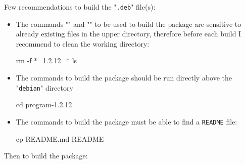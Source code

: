 Few recommendations to build the "\texttt{.deb}" file(s): 
\begin{itemize}
\item The commands "" and "" to be used to build the package are sensitive to already existing files in the upper directory, therefore before each build I recommend to clean the working directory:
{\footnotesize{
\begin{scripti}
\uprompt{~} rm -f *\_1.2.12\_*
\uprompt{~} ls
\end{scripti}
}}
\item The commands to build the package should be run directly above the "\texttt{debian}" directory
{\footnotesize{
\begin{scripti}
\uprompt{~} cd program-1.2.12
\end{scripti}
}}
\item The commands to build the package must be able to find a \texttt{README} file:
{\footnotesize{
\begin{scripti}
 cp README.md README
\end{scripti}
}}
\end{itemize}
\newpage
\noindent Then to build the package: 

